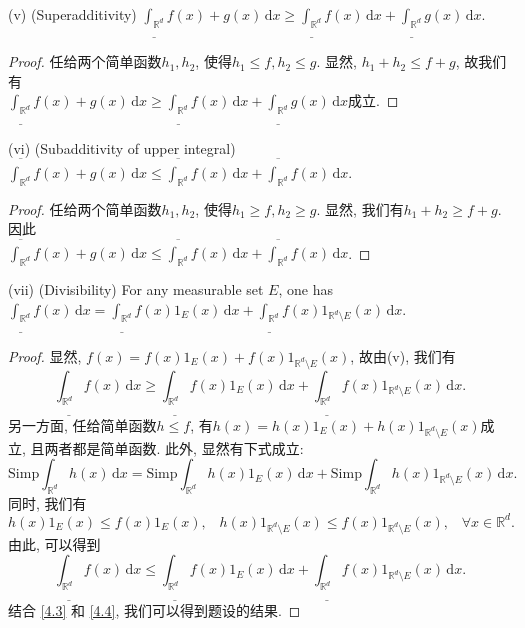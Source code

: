 \documentclass[reqno,a4paper,10pt]{amsart}
\newcommand\dif{\,\mathrm{d}}
\newcommand\Rnum{\mathbb{R}}
\begin{document}
(v) (Superadditivity) $\underline{\int_{\Rnum^d}}f(x)+g(x)\dif x\geq \underline{\int_{\Rnum^d}}f(x)\dif x+\underline{\int_{\Rnum^d}}g(x)\dif x$.
\begin{proof}
    任给两个简单函数$h_1,h_2$, 使得$h_1\leq f,h_2\leq g$. 显然, $h_1+h_2\leq f+g$, 故我们有\\
    $\underline{\int_{\Rnum^d}}f(x)+g(x)\dif x\geq \underline{\int_{\Rnum^d}}f(x)\dif x+\underline{\int_{\Rnum^d}}g(x)\dif x$成立. 
\end{proof}
(vi) (Subadditivity of upper integral) $\overline{\int_{\Rnum^d}}f(x)+g(x)\dif x\leq \overline{\int_{\Rnum^d}}f(x)\dif x+\overline{\int_{\Rnum^d}}f(x)\dif x$.
\begin{proof}
    任给两个简单函数$h_1,h_2$, 使得$h_1\geq f,h_2\geq g$. 显然, 我们有$h_1+h_2\geq f+g$. 因此\\
    $\overline{\int_{\Rnum^d}}f(x)+g(x)\dif x\leq \overline{\int_{\Rnum^d}}f(x)\dif x+\overline{\int_{\Rnum^d}}f(x)\dif x$. 
\end{proof}
(vii) (Divisibility) For any measurable set $E$, one has $\underline{\int_{\Rnum^d}}f(x)\dif x =\underline{\int_{\Rnum^d}}f(x)1_{E}(x)\dif x+\underline{\int_{\Rnum^d}}f(x)1_{\Rnum^d\setminus E}(x)\dif x$.
\begin{proof}
    显然, $f(x)=f(x)1_{E}(x)+f(x)1_{\Rnum^d\setminus E}(x)$, 故由(v), 我们有
    \begin{equation}
        \underline{\int_{\Rnum^d}}f(x)\dif x \geq \underline{\int_{\Rnum^d}}f(x)1_{E}(x)\dif x+\underline{\int_{\Rnum^d}}f(x)1_{\Rnum^d\setminus E}(x)\dif x.
        \label{4.3}
    \end{equation}
    另一方面, 任给简单函数$h\leq f$, 有$h(x)=h(x)1_{E}(x)+h(x)1_{\Rnum^d\setminus E}(x)$成立, 且两者都是简单函数. 此外, 显然有下式成立: 
    \begin{equation*}
        \mathrm{Simp}\int_{\Rnum^d} h(x)\dif x=\mathrm{Simp}\int_{\Rnum^d} h(x)1_{E}(x)\dif x+\mathrm{Simp}\int_{\Rnum^d} h(x)1_{\Rnum^d\setminus E}(x)\dif x.
    \end{equation*}
    同时, 我们有
    \begin{equation*}
        h(x)1_{E}(x)\leq f(x)1_{E}(x),\;\;\; h(x)1_{\Rnum^d\setminus E}(x)\leq f(x)1_{\Rnum^d\setminus E}(x),\;\;\;\forall x\in\Rnum^d.
    \end{equation*}
    由此, 可以得到
    \begin{equation}
        \underline{\int_{\Rnum^d}}f(x)\dif x \leq \underline{\int_{\Rnum^d}}f(x)1_{E}(x)\dif x+\underline{\int_{\Rnum^d}}f(x)1_{\Rnum^d\setminus E}(x)\dif x.
        \label{4.4}
    \end{equation}
    结合 \eqref{4.3} 和 \eqref{4.4}, 我们可以得到题设的结果. 
\end{proof}
\end{document}
